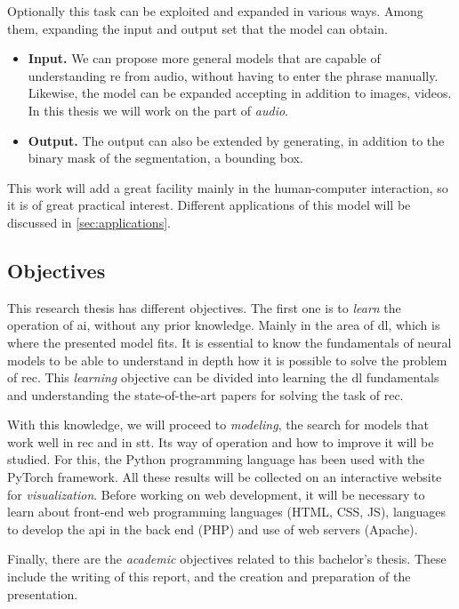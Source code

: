 Optionally this task can be exploited and expanded in various ways. Among them,
expanding the input and output set that the model can obtain.
\begin{itemize}
  \item \textbf{Input.} We can propose more general models that are capable
  of understanding \gls{re} from audio, without having to enter the phrase
  manually. Likewise, the model can be expanded accepting in addition to
  images, videos. In this thesis we will work on the part of \emph{audio}.
  \item \textbf{Output.} The output can also be extended by generating, in
  addition to the binary mask of the segmentation, a bounding
  box.
\end{itemize}

This work will add a great facility mainly in the human-computer interaction,
so it is of great practical interest. Different applications of this model will
be discussed in \vref{sec:applications}.


\subsection{Objectives}

This research thesis has different objectives. The first one is to \emph{learn}
the operation of \gls{ai}, without any prior knowledge. Mainly in the area of
\gls{dl}, which is where the presented model fits. It is essential to know the
fundamentals of neural models to be able to understand in depth how it is
possible to solve the problem of \gls{rec}. This \emph{learning} objective can
be divided into learning the \gls{dl} fundamentals and understanding the
state-of-the-art papers for solving the task of \gls{rec}.

With this knowledge, we will proceed to \emph{modeling}, the search for models
that work well in \gls{rec} and in \gls{stt}. Its way of operation and how to
improve it will be studied. For this, the Python programming language has been
used with the PyTorch framework. All these results will be collected on an
interactive website for \emph{visualization}. Before working on web
development, it will be necessary to learn about front-end web programming
languages (HTML, CSS, JS), languages to develop the \gls{api} in the back end
(PHP) and use of web servers (Apache).

Finally, there are the \emph{academic} objectives related to this bachelor's
thesis. These include the writing of this report, and the creation and
preparation of the presentation.


